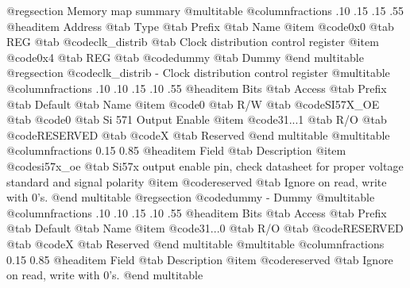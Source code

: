 @regsection Memory map summary
@multitable  @columnfractions .10 .15 .15 .55
@headitem Address @tab Type @tab Prefix @tab Name
@item @code{0x0} @tab
REG @tab
@code{clk_distrib} @tab
Clock distribution control register
@item @code{0x4} @tab
REG @tab
@code{dummy} @tab
Dummy
@end multitable 
@regsection @code{clk_distrib} - Clock distribution control register
@multitable @columnfractions .10 .10 .15 .10 .55
@headitem Bits @tab Access @tab Prefix @tab Default @tab Name
@item @code{0}
@tab R/W @tab
@code{SI57X_OE}
@tab @code{0} @tab 
Si 571 Output Enable
@item @code{31...1}
@tab R/O @tab
@code{RESERVED}
@tab @code{X} @tab 
Reserved
@end multitable
@multitable @columnfractions 0.15 0.85
@headitem Field @tab Description
@item @code{si57x_oe} @tab Si57x output enable pin, check datasheet for proper voltage standard and signal polarity
@item @code{reserved} @tab Ignore on read, write with 0's.
@end multitable
@regsection @code{dummy} - Dummy
@multitable @columnfractions .10 .10 .15 .10 .55
@headitem Bits @tab Access @tab Prefix @tab Default @tab Name
@item @code{31...0}
@tab R/O @tab
@code{RESERVED}
@tab @code{X} @tab 
Reserved
@end multitable
@multitable @columnfractions 0.15 0.85
@headitem Field @tab Description
@item @code{reserved} @tab Ignore on read, write with 0's.
@end multitable
